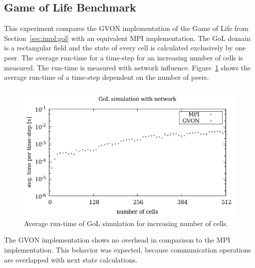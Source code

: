 \subsection{Game of Life Benchmark}
This experiment compares the GVON implementation of the Game of Life
from Section~\ref{sec:impl:gol} with an equivalent MPI
implementation. The GoL domain is a rectangular field and the state of
every cell is calculated exclusively by one peer. The average run-time
for a time-step for an increasing number of cells is measured. The
run-time is measured with network influence.
Figure~\ref{fig:gol_laser} shows the average run-time of a time-step
dependent on the number of peers.

\begin{figure}[H]
  \includegraphics[width=\textwidth]{plots/50_gol_network_laser}
  \caption{Average run-time of GoL simulation for increasing number
    of cells.}
  \label{fig:gol_laser}
\end{figure}

\noindent The GVON implementation shows no overhead in comparison to
the MPI implementation. This behavior was expected, because
communication operations are overlapped with next state calculations.


